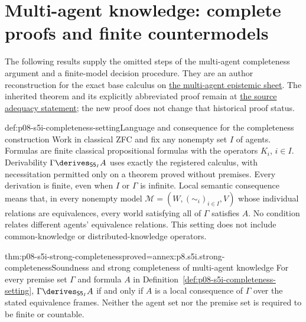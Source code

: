 \section{Multi-agent knowledge: complete proofs and finite countermodels}
\label{sec:p08-s5i-completion}

The following results supply the omitted steps of the multi-agent
completeness argument and a finite-model decision procedure. They are an
author reconstruction for the exact base calculus on
\hyperref[sheet:hilbert-s5n]{the multi-agent epistemic sheet}. The inherited
theorem and its explicitly abbreviated proof remain at
\hyperref[thm:p08-source-s5n-adequacy]{the source adequacy statement}; the
new proof does not change that historical proof status.

\begin{hbdefinition}{def:p08-s5i-completeness-setting}{Language and consequence for the completeness construction}
Work in classical ZFC and fix any nonempty set \(I\) of agents. Formulas
are finite classical propositional formulas with the operators \(K_i\),
\(i\in I\). Derivability
\(\Gamma\derives_{\mathsf{S5}_I}A\) uses exactly the registered calculus,
with necessitation permitted only on a theorem proved without premises.
Every derivation is finite, even when \(I\) or \(\Gamma\) is infinite.
Local semantic consequence means that, in every nonempty model
\(\mathcal M=(W,(\sim_i)_{i\in I},V)\) whose individual relations are
equivalences, every world satisfying all of \(\Gamma\) satisfies \(A\).
No condition relates different agents' equivalence relations. This setting
does not include common-knowledge or distributed-knowledge operators.
\end{hbdefinition}

\begin{hbtheorem}{thm:p08-s5i-strong-completeness}{proved=annex:p8.s5i.strong-completeness}{Soundness and strong completeness of multi-agent knowledge}
For every premise set \(\Gamma\) and formula \(A\) in
Definition~\ref{def:p08-s5i-completeness-setting},
\(\Gamma\derives_{\mathsf{S5}_I}A\) if and only if \(A\) is a local
consequence of \(\Gamma\) over the stated equivalence frames. Neither the
agent set nor the premise set is required to be finite or countable.
\end{hbtheorem}

